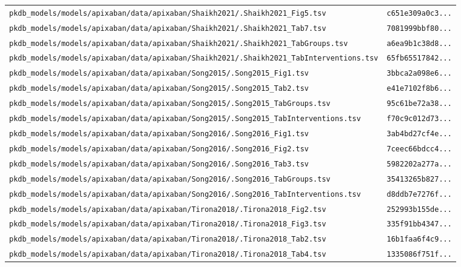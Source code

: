 \documentclass{article}
\begin{document}
\begin{longtable}{ll}
\texttt{pkdb\_models/models/apixaban/data/apixaban/Shaikh2021/.Shaikh2021\_Fig5.tsv} & \texttt{c651e309a0c3...} \\
\texttt{pkdb\_models/models/apixaban/data/apixaban/Shaikh2021/.Shaikh2021\_Tab7.tsv} & \texttt{7081999bbf80...} \\
\texttt{pkdb\_models/models/apixaban/data/apixaban/Shaikh2021/.Shaikh2021\_TabGroups.tsv} & \texttt{a6ea9b1c38d8...} \\
\texttt{pkdb\_models/models/apixaban/data/apixaban/Shaikh2021/.Shaikh2021\_TabInterventions.tsv} & \texttt{65fb65517842...} \\
\texttt{pkdb\_models/models/apixaban/data/apixaban/Song2015/.Song2015\_Fig1.tsv} & \texttt{3bbca2a098e6...} \\
\texttt{pkdb\_models/models/apixaban/data/apixaban/Song2015/.Song2015\_Tab2.tsv} & \texttt{e41e7102f8b6...} \\
\texttt{pkdb\_models/models/apixaban/data/apixaban/Song2015/.Song2015\_TabGroups.tsv} & \texttt{95c61be72a38...} \\
\texttt{pkdb\_models/models/apixaban/data/apixaban/Song2015/.Song2015\_TabInterventions.tsv} & \texttt{f70c9c012d73...} \\
\texttt{pkdb\_models/models/apixaban/data/apixaban/Song2016/.Song2016\_Fig1.tsv} & \texttt{3ab4bd27cf4e...} \\
\texttt{pkdb\_models/models/apixaban/data/apixaban/Song2016/.Song2016\_Fig2.tsv} & \texttt{7ceec66bdcc4...} \\
\texttt{pkdb\_models/models/apixaban/data/apixaban/Song2016/.Song2016\_Tab3.tsv} & \texttt{5982202a277a...} \\
\texttt{pkdb\_models/models/apixaban/data/apixaban/Song2016/.Song2016\_TabGroups.tsv} & \texttt{35413265b827...} \\
\texttt{pkdb\_models/models/apixaban/data/apixaban/Song2016/.Song2016\_TabInterventions.tsv} & \texttt{d8ddb7e7276f...} \\
\texttt{pkdb\_models/models/apixaban/data/apixaban/Tirona2018/.Tirona2018\_Fig2.tsv} & \texttt{252993b155de...} \\
\texttt{pkdb\_models/models/apixaban/data/apixaban/Tirona2018/.Tirona2018\_Fig3.tsv} & \texttt{335f91bb4347...} \\
\texttt{pkdb\_models/models/apixaban/data/apixaban/Tirona2018/.Tirona2018\_Tab2.tsv} & \texttt{16b1faa6f4c9...} \\
\texttt{pkdb\_models/models/apixaban/data/apixaban/Tirona2018/.Tirona2018\_Tab4.tsv} & \texttt{1335086f751f...} \\

\end{longtable}
\end{document}

